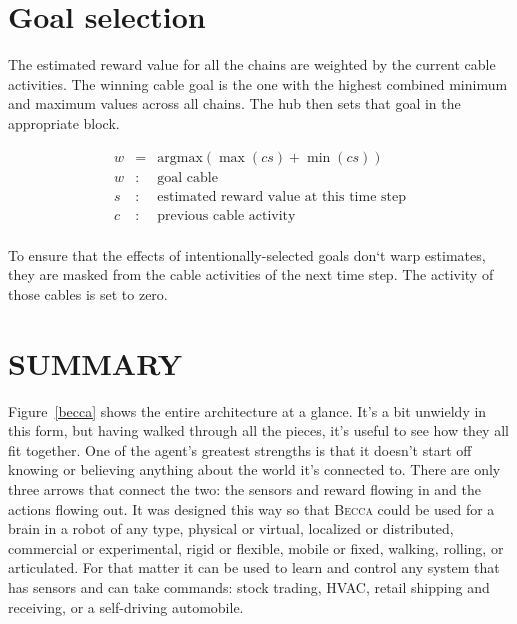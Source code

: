 \documentclass[oneside,twocolumn]{article}
\begin{document}
\section*{\color{copper} Goal selection}

The estimated reward value for all the chains are weighted by the current cable activities. The winning cable goal is the one with the highest combined minimum and maximum values across all chains. The hub then sets that goal in the appropriate block. 

\begin{eqnarray*}
w &= & \mbox{argmax} ( \max (cs) + \min (cs) )\\ 
w &:& \mbox{goal cable} \\
s &:& \mbox{estimated reward value at this time step} \\
c &:& \mbox{previous cable activity} \\
\end{eqnarray*}

To ensure that the effects of intentionally-selected goals don`t warp estimates, they are masked from the cable activities of the next time step. The activity of those cables is set to zero.

\section*{\color{copper} SUMMARY}

Figure~\ref{becca} shows the entire architecture at a glance. It's a bit unwieldy in this form, but having walked through all the pieces, it's useful to see how they all fit together. One of the agent's greatest strengths is that it doesn't start off knowing or believing anything about the world it's connected to. There are only three arrows that connect the two: the sensors and reward flowing in and the actions flowing out. It was designed this way so that \textsc{Becca} could be used for a brain in a robot of any type, physical or virtual, localized or distributed, commercial or experimental, rigid or flexible, mobile or fixed, walking, rolling, or articulated. For that matter it can be used to learn and control any system that has sensors and can take commands: stock trading, HVAC, retail shipping and receiving, or a self-driving  automobile.
\end{document}
